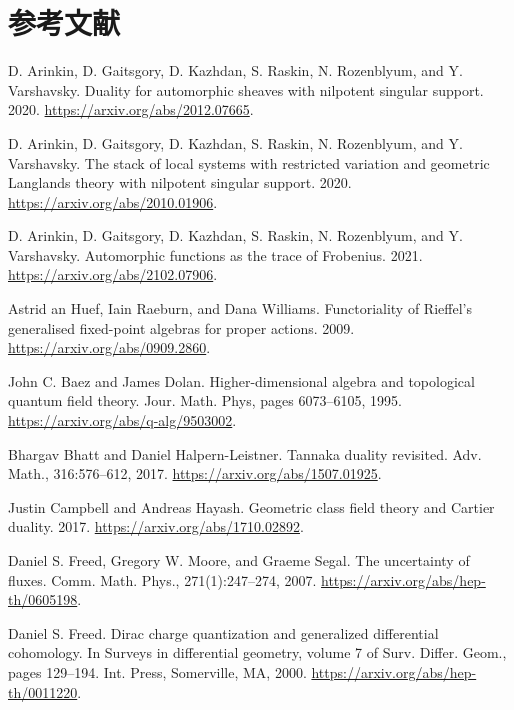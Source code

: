 \section*{参考文献}
\begin{list}{}{\setlength{\leftmargin}{5.6em}\setlength{\labelwidth}{5.2em}
\setlength{\itemindent}{0pt}\setlength{\labelsep}{0.4em}\setlength{\parsep}{0.25em}
\raggedright}
\item[{[AGK+20a]}]
D. Arinkin, D. Gaitsgory, D. Kazhdan, S. Raskin, N. Rozenblyum, and Y. Varshavsky. Duality for automorphic sheaves with nilpotent singular support. 2020. \url{https://arxiv.org/abs/2012.07665}.
\item[{[AGK+20b]}]
D. Arinkin, D. Gaitsgory, D. Kazhdan, S. Raskin, N. Rozenblyum, and Y. Varshavsky. The stack of local systems with restricted variation and geometric Langlands theory with nilpotent singular support. 2020. \url{https://arxiv.org/abs/2010.01906}.
\item[{[AGK+21]}]
D. Arinkin, D. Gaitsgory, D. Kazhdan, S. Raskin, N. Rozenblyum, and Y. Varshavsky. Automorphic functions as the trace of Frobenius. 2021. \url{https://arxiv.org/abs/2102.07906}.
\item[{[aHRW09]}]
Astrid an Huef, Iain Raeburn, and Dana Williams. Functoriality of Rieffel's generalised fixed-point algebras for proper actions. 2009. \url{https://arxiv.org/abs/0909.2860}.
\item[{[BD95]}]
John C. Baez and James Dolan. Higher-dimensional algebra and topological quantum field theory. Jour. Math. Phys, pages 6073--6105, 1995. \url{https://arxiv.org/abs/q-alg/9503002}.
\item[{[BHL17]}]
Bhargav Bhatt and Daniel Halpern-Leistner. Tannaka duality revisited. Adv. Math., 316:576--612, 2017. \url{https://arxiv.org/abs/1507.01925}.
\item[{[Cam17]}]
Justin Campbell and Andreas Hayash. Geometric class field theory and Cartier duality. 2017. \url{https://arxiv.org/abs/1710.02892}.
\item[{[FMS07]}]
Daniel S. Freed, Gregory W. Moore, and Graeme Segal. The uncertainty of fluxes. Comm. Math. Phys., 271(1):247--274, 2007. \url{https://arxiv.org/abs/hep-th/0605198}.
\item[{[Fre00]}]
Daniel S. Freed. Dirac charge quantization and generalized differential cohomology. In Surveys in differential geometry, volume 7 of Surv. Differ. Geom., pages 129--194. Int. Press, Somerville, MA, 2000. \url{https://arxiv.org/abs/hep-th/0011220}.

\end{list}

